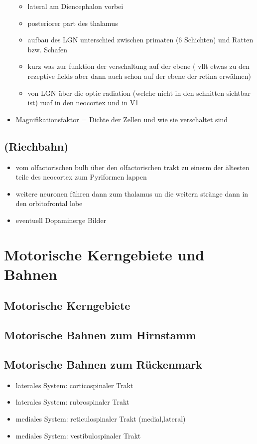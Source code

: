 \documentclass[12pt,a4paper,pdftex]{article}
\begin{document}
\begin{itemize}
    \begin{itemize}
        \item lateral am Diencephalon  vorbei
        \item posteriorer part des thalamus
        \item aufbau des LGN unterschied zwischen primaten (6 Schichten) und Ratten bzw. Schafen
        \item kurz was zur funktion der verschaltung auf der ebene ( vllt etwas zu den rezeptive fields aber dann auch schon auf der ebene der retina erwähnen)
        \item von LGN über die optic radiation (welche nicht in den schnitten sichtbar ist) ruaf in den neocortex und in V1 
    \end{itemize}
    \item Magnifikationsfaktor = Dichte der Zellen und wie sie verschaltet sind
    \\
\end{itemize}
\subsection{(Riechbahn)}
\begin{itemize}
    \item vom olfactorischen bulb über den olfactorischen trakt zu einerm der ältesten teile des neocortex zum Pyriformen lappen
    \item weitere neuronen führen dann zum thalamus un die weitern stränge dann in den orbitofrontal lobe \cite{smith2008biology} 
    \item eventuell Dopaminerge Bilder
\end{itemize}

\newpage
\section{Motorische Kerngebiete und Bahnen}
\subsection{Motorische Kerngebiete}
\subsection{Motorische Bahnen zum Hirnstamm}
\subsection{Motorische Bahnen zum Rückenmark}
\begin{itemize}
    \item laterales System: corticospinaler Trakt
    \item laterales System: rubrospinaler Trakt
    \item mediales System: reticulospinaler Trakt (medial,lateral)
    \item mediales System: vestibulospinaler Trakt
\end{itemize}
\end{document}
